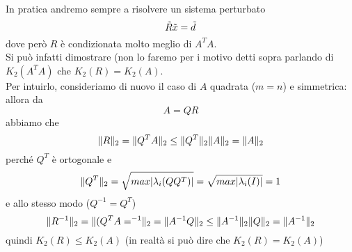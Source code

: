 In pratica andremo sempre a risolvere un sistema perturbato
\begin{equation*}
    \Tilde{R}\Tilde{x}=\Tilde{d}
\end{equation*}
dove però $R$ è condizionata molto meglio di $A^TA$. \\
Si può infatti dimostrare (non lo faremo per i motivo detti sopra parlando di $K_2(A^TA)$ che $K_2(R)=K_2(A)$. \\
Per intuirlo, consideriamo di nuovo il caso di $A$ quadrata ($m=n$) e simmetrica: allora da
\begin{equation*}
    A=QR
\end{equation*}
abbiamo che
\begin{equation*}
    \lVert R\rVert_2 = \lVert Q^TA\rVert_2 \leq \lVert Q^T\rVert_2\lVert A\rVert_2 = \lVert A\rVert_2
\end{equation*}
perché $Q^T$ è ortogonale e 
\begin{equation*}
    \lVert Q^T\rVert_2=\sqrt{max|\lambda_i(QQ^T)|}=\sqrt{max|\lambda_i(I)|}=1
\end{equation*}
e allo stesso modo ($Q^{-1}=Q^T$)
\begin{equation*}
    \lVert R^{-1}\rVert_2 = \lVert(Q^TA=^{-1}\rVert_2=\lVert A^{-1}Q\rVert_2 \leq \lVert A^{-1}\rVert_2\lVert Q\rVert_2 = \lVert A^{-1}\rVert_2 
\end{equation*}
quindi $K_2(R)\leq K_2(A)$ (in realtà si può dire che $K_2(R)=K_2(A)$)
